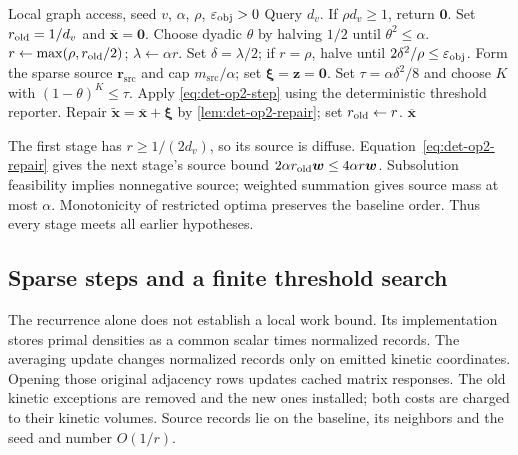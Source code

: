 \begin{algorithm}[t]
\caption{Deterministic constrained accelerated continuation}
\label{alg:det-op2}
\begin{algorithmic}[1]
\REQUIRE Local graph access, seed $v$, $\alpha$, $\rho$, $\varepsilon_{\mathrm{obj}}>0$
\STATE Query $d_v$. If $\rho d_v\geq1$, return $\bm{0}$.
\STATE Set $r_{\rm old}=1/d_v$ and $\overline{\bm{x}}=\bm{0}$.
\STATE Choose dyadic $\theta$ by halving $1/2$ until $\theta^2\leq\alpha$.
\REPEAT
\STATE $r\gets\max(\rho,r_{\rm old}/2)$; $\lambda\gets\alpha r$.
\STATE Set $\delta=\lambda/2$; if $r=\rho$, halve until
       $2\delta^2/\rho\leq\varepsilon_{\mathrm{obj}}$.
\STATE Form the sparse source $\bm{r}_{\mathrm{src}}$ and cap
       $m_{\mathrm{src}}/\alpha$; set $\bm{\xi}=\bm{z}=\bm{0}$.
\STATE Set $\tau=\alpha\delta^2/8$ and choose $K$ with
       $(1-\theta)^K\leq\tau$.
\STATE Apply \eqref{eq:det-op2-step} using the deterministic threshold reporter.
\ENDFOR
\STATE Repair $\widetilde{\bm{x}}=\overline{\bm{x}}+\bm{\xi}$ by
       \cref{lem:det-op2-repair}; set $r_{\rm old}\gets r$.
\RETURN $\overline{\bm{x}}$
\end{algorithmic}
\end{algorithm}

The first stage has $r\geq1/(2d_v)$, so its source is diffuse.
Equation~\eqref{eq:det-op2-repair} gives the next stage's source bound
$2\alpha r_{\rm old}\bm{w}\leq4\alpha r\bm{w}$.
Subsolution feasibility implies nonnegative source; weighted summation gives
source mass at most $\alpha$. Monotonicity of restricted optima preserves
the baseline order. Thus every stage meets all earlier hypotheses.

\subsection{Sparse steps and a finite threshold search}
The recurrence alone does not establish a local work bound. Its implementation
stores primal densities as a common scalar times normalized records.
The averaging update changes normalized records only on emitted kinetic
coordinates. Opening those original adjacency rows updates cached matrix
responses. The old kinetic exceptions are removed and the new ones installed;
both costs are charged to their kinetic volumes. Source records lie on the
baseline, its neighbors and the seed and number $O(1/r)$.


